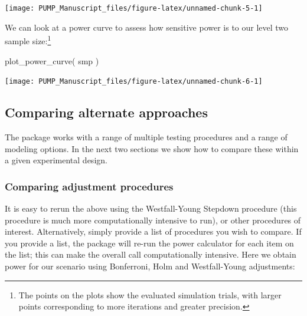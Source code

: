 \documentclass[
]{article}
\newenvironment{Shaded}{\begin{snugshade}}{\end{snugshade}}
\newcommand{\FunctionTok}[1]{\textcolor[rgb]{0.00,0.00,0.00}{#1}}
\newcommand{\NormalTok}[1]{#1}
\begin{document}
\begin{center}\texttt{[image: PUMP\_Manuscript\_files/figure-latex/unnamed-chunk-5-1]} \end{center}

We can look at a power curve to assess how sensitive power is to our
level two sample
size:\footnote{The points on the plots show the evaluated simulation trials, with larger points corresponding to more iterations and greater precision.}

\begin{Shaded}
\begin{Highlighting}[]
\FunctionTok{plot\_power\_curve}\NormalTok{( smp )}
\end{Highlighting}
\end{Shaded}

\begin{center}\texttt{[image: PUMP\_Manuscript\_files/figure-latex/unnamed-chunk-6-1]} \end{center}

\subsection{Comparing alternate approaches}

The package works with a range of multiple testing procedures and a
range of modeling options. In the next two sections we show how to
compare these within a given experimental design.

\subsubsection{Comparing adjustment procedures}

It is easy to rerun the above using the Westfall-Young Stepdown
procedure (this procedure is much more computationally intensive to
run), or other procedures of interest. Alternatively, simply provide a
list of procedures you wish to compare. If you provide a list, the
package will re-run the power calculator for each item on the list; this
can make the overall call computationally intensive. Here we obtain
power for our scenario using Bonferroni, Holm and Westfall-Young
adjustments:
\end{document}
